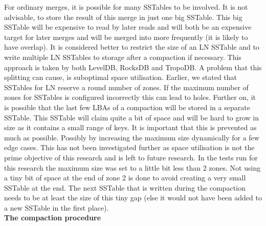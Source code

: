For ordinary merges, it is possible for many SSTables to be involved. It is not advisable, to store the result of this merge in just one big SSTable. This big SSTable will be expensive to read by later reads and will both be an expensive target for later merges and will be merged into more frequently (it is likely to have overlap). It is considered better to restrict the size of an LN SSTable and to write multiple LN SSTables to storage after a compaction if necessary. This approach is taken by both LevelDB, RocksDB and TropoDB. A problem that this splitting can cause, is suboptimal space utilisation. Earlier, we stated that SSTables for LN reserve a round number of zones. If the maximum number of zones for SSTables is configured incorrectly this can lead to holes. Further on, it is possible that the last few LBAs of a compaction will be stored in a separate SSTable. This SSTable will claim quite a bit of space and will be hard to grow in size as it contains a small range of keys. It is important that this is prevented as much as possible. Possibly by increasing the maximum size dynamically for a few edge cases. This has not been investigated further as space utilisation is not the prime objective of this research and is left to future research. In the tests run for this research the maximum size was set to a little bit less than 2 zones. Not using a tiny bit of space at the end of zone 2 is done to avoid creating a very small SSTable at the end. The next SSTable that is written during the compaction needs to be at least the size of this tiny gap (else it would not have been added to a new SSTable in the first place).\\
\textbf{The compaction procedure}\\
